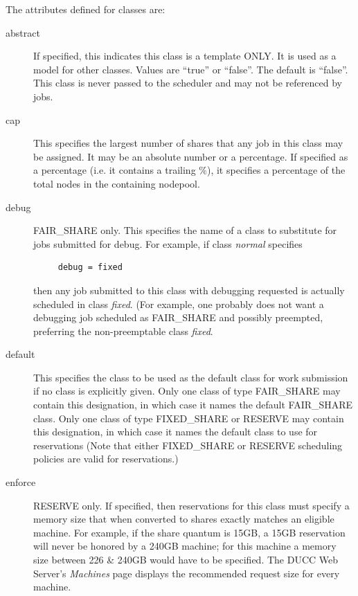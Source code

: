     The attributes defined for classes are:
    \begin{description}

      \item[abstract] If specified, this indicates this class is a template ONLY. It is used
        as a model for other classes.  Values are ``true'' or ``false''.  The default is
        ``false''.  This class is never passed to the scheduler and may not be referenced
        by jobs.

      \item[cap] This specifies the largest number of shares that any job in this class
        may be assigned.  It may be an absolute number or a percentage.  If specified as
        a percentage (i.e. it contains a trailing \%), it specifies a percentage of the
        total nodes in the containing nodepool.

      \item[debug] FAIR\_SHARE only. This specifies the name of a class to substitute
        for jobs submitted for debug.  For example, if class {\em normal} specifies
\begin{verbatim}
     debug = fixed
\end{verbatim}
        then any job submitted to this class with debugging requested is actually scheduled
        in class {\em fixed}. (For example, one probably does not want a debugging job
        scheduled as FAIR\_SHARE and possibly preempted, preferring the non-preemptable
        class {\em fixed}.

      \item[default] This specifies the class to be used as the default class for work submission
        if no class is explicitly given.  Only one class of type FAIR\_SHARE may contain this
        designation, in which case it names the default FAIR\_SHARE class.  Only one class of type
        FIXED\_SHARE or RESERVE may contain this designation, in which case it names the default
        class to use for reservations (Note that either FIXED\_SHARE or RESERVE scheduling policies
        are valid for reservations.)

      \item[enforce] RESERVE only.  If specified, then reservations for this class must specify a
        memory size that when converted to shares exactly matches an eligible machine.  For example,
        if the share quantum is 15GB, a 15GB reservation will never be honored by a 240GB machine; 
        for this machine a memory size between 226 \& 240GB would have to be specified.  
        The DUCC Web Server's {\em Machines} page displays the recommended request size for every machine.  


\end{description}
